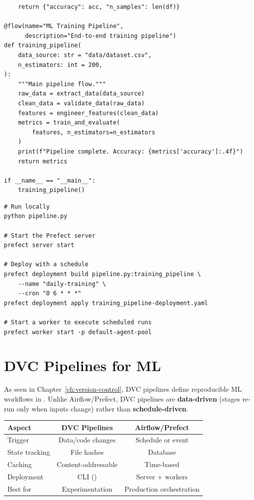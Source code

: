 \begin{codeblock}[title=\textbf{Complete Prefect ML pipeline}]
\begin{verbatim}
    return {"accuracy": acc, "n_samples": len(df)}

@flow(name="ML Training Pipeline",
      description="End-to-end training pipeline")
def training_pipeline(
    data_source: str = "data/dataset.csv",
    n_estimators: int = 200,
):
    """Main pipeline flow."""
    raw_data = extract_data(data_source)
    clean_data = validate_data(raw_data)
    features = engineer_features(clean_data)
    metrics = train_and_evaluate(
        features, n_estimators=n_estimators
    )
    print(f"Pipeline complete. Accuracy: {metrics['accuracy']:.4f}")
    return metrics

if __name__ == "__main__":
    training_pipeline()
\end{verbatim}
\end{codeblock}

\begin{codeblock}[title=\textbf{Running and scheduling Prefect flows}]
\begin{verbatim}
# Run locally
python pipeline.py

# Start the Prefect server
prefect server start

# Deploy with a schedule
prefect deployment build pipeline.py:training_pipeline \
    --name "daily-training" \
    --cron "0 6 * * *"
prefect deployment apply training_pipeline-deployment.yaml

# Start a worker to execute scheduled runs
prefect worker start -p default-agent-pool
\end{verbatim}
\end{codeblock}

\section{DVC Pipelines for ML}
\label{sec:dvc-pipelines-ch5}

As seen in Chapter~\ref{ch:version-control}, DVC pipelines define
reproducible ML workflows in . Unlike Airflow/Prefect,
DVC pipelines are \textbf{data-driven} (stages re-run only when inputs
change) rather than \textbf{schedule-driven}.

\begin{center}
\begin{tabular}{@{}lcc@{}}
\toprule
\textbf{Aspect} & \textbf{DVC Pipelines} & \textbf{Airflow/Prefect} \\
\midrule
Trigger         & Data/code changes & Schedule or event \\
State tracking  & File hashes       & Database \\
Caching         & Content-addressable & Time-based \\
Deployment      & CLI (\cli{dvc repro}) & Server + workers \\
Best for        & Experimentation   & Production orchestration \\
\bottomrule
\end{tabular}
\end{center}

